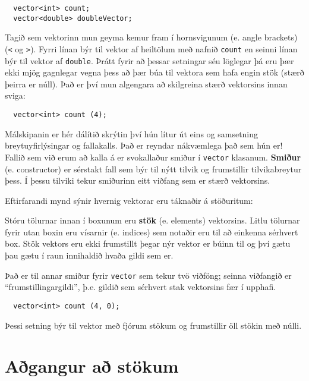 \begin{verbatim}
  vector<int> count;
  vector<double> doubleVector;
\end{verbatim}
%
Tagið sem vektorinn mun geyma kemur fram í hornsvigunum (e. angle brackets) ({\tt <} og {\tt >}).
Fyrri línan býr til vektor af heiltölum með nafnið {\tt count} en seinni línan býr til vektor af {\tt double}.
Þrátt fyrir að þessar setningar séu löglegar þá eru þær ekki mjög gagnlegar vegna þess að þær búa til vektora sem hafa engin stök (stærð þeirra er núll).
Það er því mun algengara að skilgreina stærð vektorsins innan sviga: 

\begin{verbatim}
  vector<int> count (4);
\end{verbatim}
%
Málskipanin er hér dálítið skrýtin því hún lítur út eins og samsetning breytuyfirlýsingar og fallakalls.
Það er reyndar nákvæmlega það sem hún er!
Fallið sem við erum að kalla á er svokallaður smiður í {\tt vector} klasanum.
{\bf Smiður} (e. constructor) er sérstakt fall sem býr til nýtt tilvik og frumstillir tilvikabreytur þess.
Í þessu tilviki tekur smiðurinn eitt viðfang sem er stærð vektorsins.


Eftirfarandi mynd sýnir hvernig vektorar eru táknaðir á stöðuritum:

\vspace{0.1in}
\centerline{}
\vspace{0.1in}

Stóru tölurnar innan í boxunum eru {\bf stök} (e. elements) vektorsins. 
Litlu tölurnar fyrir utan boxin eru vísarnir (e. indices) sem notaðir eru til að einkenna sérhvert box.
Stök vektors eru ekki frumstillt þegar nýr vektor er búinn til og því gætu þau gætu í raun innihaldið hvaða gildi sem er.

Það er til annar smiður fyrir {\tt vector} sem tekur tvö viðföng; seinna viðfangið er ``frumstillingargildi'', þ.e. gildið sem sérhvert stak vektorsins fær í upphafi.

\begin{verbatim}
  vector<int> count (4, 0);
\end{verbatim}
%
Þessi setning býr til vektor með fjórum stökum og frumstillir öll stökin með núlli.

\section{Aðgangur að stökum}

